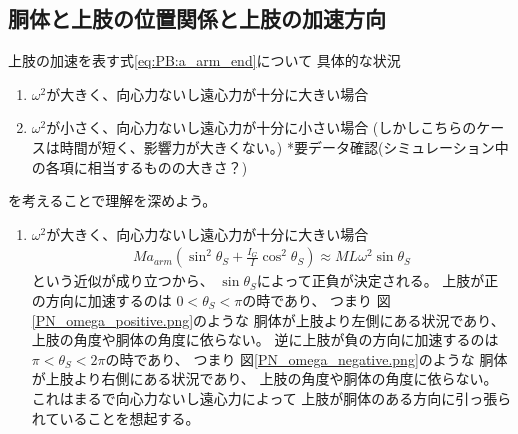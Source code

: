 \documentclass[a4paper,11pt]{jsarticle}
\begin{document}
\subsection{胴体と上肢の位置関係と上肢の加速方向}

上肢の加速を表す式\ref{eq:PB:a_arm_end}について
具体的な状況
\begin{enumerate}
  \item $\omega^2$が大きく、向心力ないし遠心力が十分に大きい場合
  \item $\omega^2$が小さく、向心力ないし遠心力が十分に小さい場合
  (しかしこちらのケースは時間が短く、影響力が大きくない。)
  *要データ確認(シミュレーション中の各項に相当するものの大きさ？)
\end{enumerate}
を考えることで理解を深めよう。


\begin{enumerate}
  \item $\omega^2$が大きく、向心力ないし遠心力が十分に大きい場合
  \begin{align}
    Ma_{arm}\left( \sin^2\theta_S + \frac{I_G}{I}\cos^2\theta_S \right)
    \approx ML\omega^2 \sin\theta_S
  \end{align}
  という近似が成り立つから、
  $\sin\theta_S$によって正負が決定される。
  上肢が正の方向に加速するのは
  $0<\theta_S<\pi$の時であり、
  つまり
  図\ref{PN_omega_positive.png}のような
  胴体が上肢より左側にある状況であり、
  上肢の角度や胴体の角度に依らない。
  逆に上肢が負の方向に加速するのは
  $\pi<\theta_S<2\pi$の時であり、
  つまり
  図\ref{PN_omega_negative.png}のような
  胴体が上肢より右側にある状況であり、
  上肢の角度や胴体の角度に依らない。
  これはまるで向心力ないし遠心力によって
  上肢が胴体のある方向に引っ張られていることを想起する。


\end{enumerate}
\end{document}
